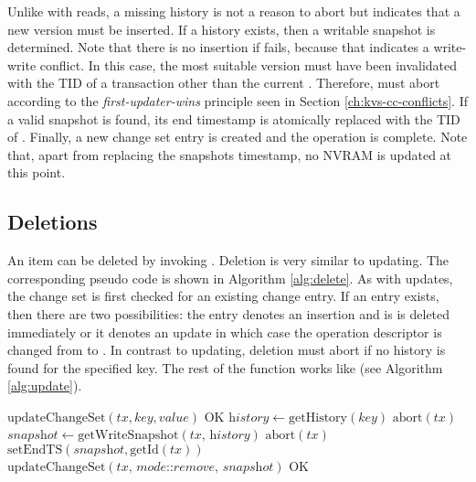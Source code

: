 Unlike with reads, a missing history is not a reason to abort but indicates that a new version must be inserted. If a history exists, then a writable snapshot is determined. Note that there is no insertion if  fails, because that indicates a write-write conflict. In this case, the most suitable version must have been invalidated with the TID of a transaction other than the current . Therefore,  must abort according to the \emph{first-updater-wins} principle seen in Section \ref{ch:kvs-cc-conflicts}. If a valid snapshot is found, its end timestamp is atomically replaced with the TID of . Finally, a new change set entry is created and the operation is complete. Note that, apart from replacing the snapshots timestamp, no NVRAM is updated at this point.

\subsection{Deletions}

An item can be deleted by invoking . Deletion is very similar to updating. The corresponding pseudo code is shown in Algorithm \ref{alg:delete}. As with updates, the change set is first checked for an existing change entry. If an entry exists, then there are two possibilities: the entry denotes an insertion and is is deleted immediately or it denotes an update in which case the operation descriptor is changed from  to . In contrast to updating, deletion must abort if no history is found for the specified key. The rest of the function works like  (see Algorithm \ref{alg:update}).

\begin{algorithm}
\begin{algorithmic}[1]
\State $\text{updateChangeSet}(tx, key, value)$
\State \Return $\text{OK}$
\EndIf
\State $\textit{history} \gets \text{getHistory}(\textit{key})$
\State \Return $\text{abort}(tx)$
\EndIf
\State $\textit{snapshot} \gets \text{getWriteSnapshot}(\textit{tx, history})$
\State \Return $\text{abort}(\textit{tx})$
\EndIf
\State $\text{setEndTS}(\textit{snapshot}, \text{getId}(\textit{tx}))$
\State $\text{updateChangeSet}(\textit{tx, mode::remove, snapshot})$
\State \Return $\text{OK}$
\EndProcedure
\end{algorithmic}
\caption{}
\label{alg:delete}
\end{algorithm}

